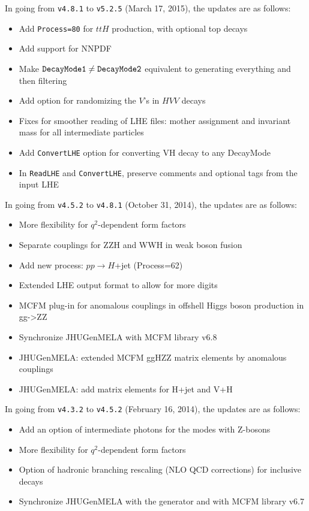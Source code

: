 \documentclass[aps,superscriptaddress,nofootinbib]{revtex4}
\begin{document}
\noindent
In going from \verb|v4.8.1| to \verb|v5.2.5| (March 17, 2015), the updates are as follows:

\begin{itemize}
\item Add \verb|Process=80| for $ttH$ production, with optional top decays
\item Add support for NNPDF
\item Make $\verb|DecayMode1|\ne\verb|DecayMode2|$ equivalent to generating everything and then filtering
\item Add option for randomizing the $V$'s in $HVV$ decays
\item Fixes for smoother reading of LHE files: mother assignment and invariant mass for all intermediate particles
\item Add \verb|ConvertLHE| option for converting VH decay to any DecayMode
\item In \verb|ReadLHE| and \verb|ConvertLHE|, preserve comments and optional tags from the input LHE
\end{itemize}

\noindent
In going from \verb|v4.5.2| to \verb|v4.8.1| (October 31, 2014), the updates are as follows:

\begin{itemize}
\item More flexibility for $q^2$-dependent form factors
\item Separate couplings for ZZH and WWH in weak boson fusion
\item Add new process: $pp\to H$+jet (Process=62)
\item Extended LHE output format to allow for more digits
\item MCFM plug-in for anomalous couplings in offshell Higgs boson production in gg->ZZ
\item Synchronize JHUGenMELA with MCFM library v6.8
\item JHUGenMELA: extended MCFM ggHZZ matrix elements by anomalous couplings
\item JHUGenMELA: add matrix elements for H+jet and V+H
\end{itemize}


\noindent
In going from \verb|v4.3.2| to \verb|v4.5.2| (February 16, 2014), the updates are as follows:

\begin{itemize}
\item Add an option of intermediate photons for the modes with Z-bosons
\item More flexibility for $q^2$-dependent form factors
\item Option of hadronic branching rescaling (NLO QCD corrections) for inclusive decays
\item Synchronize JHUGenMELA with the generator and with MCFM library v6.7
\end{itemize}
\end{document}
